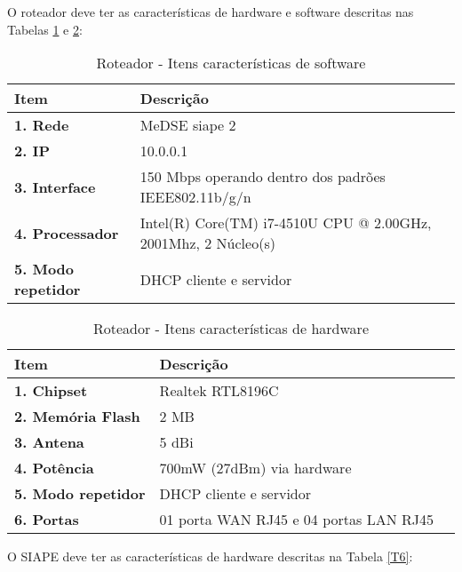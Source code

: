 O roteador deve ter as características de hardware e software descritas nas Tabelas \ref{T4} e \ref{T5}:
		
	\begin{table}
		\centering
		\caption{Roteador - Itens características  de software}
		\begin{tabular}{|p{4cm}| p{11cm}| l } \hline
			\textbf{ Item }	   & \textbf{ Descrição}	 \\ \hline
			\textbf{1. Rede }   & MeDSE siape 2\\ \hline
			\textbf{2. IP}    & 10.0.0.1\\ \hline
			\textbf{3. Interface }		  & 150 Mbps operando dentro dos padrões IEEE802.11b/g/n\\ \hline
			\textbf{4. Processador}	 &  Intel(R) Core(TM) i7-4510U CPU @ 2.00GHz, 2001Mhz, 2 Núcleo(s)\\ \hline
			\textbf{5. Modo repetidor}	 & DHCP cliente e servidor\\ \hline
		\end{tabular}
		\label{T4}\par
	\end{table}	
	
	
			\begin{table}
				\centering
				\caption{Roteador - Itens características  de hardware}
				\begin{tabular}{|p{4cm}| p{11cm}|l| } \hline
			\textbf{ Item }	   & \textbf{ Descrição}	 \\ \hline
					\textbf{1. Chipset }   & Realtek RTL8196C\\ \hline
					\textbf{2. Memória Flash}    & 2 MB\\ \hline
					\textbf{3. Antena }		  & 5 dBi\\ \hline				
					\textbf{4. Potência}	 &  700mW (27dBm) via hardware\\ \hline
					\textbf{5. Modo repetidor}	 & DHCP cliente e servidor\\ \hline
					\textbf{6. Portas}	 & 01 porta WAN RJ45 e 04 portas LAN RJ45\\ \hline
				\end{tabular}
				\label{T5}\par
			\end{table}		


O SIAPE deve ter as características de hardware descritas na Tabela \ref{T6}:

